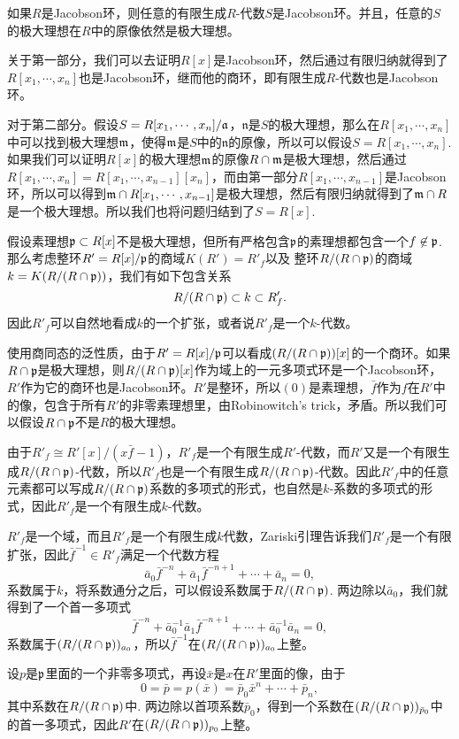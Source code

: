 \theo 如果$R$是Jacobson环，则任意的有限生成$R$-代数$S$是Jacobson环。并且，任意的$S$的极大理想在$R$中的原像依然是极大理想。

\proof 关于第一部分，我们可以去证明$R[x]$是Jacobson环，然后通过有限归纳就得到了$R[x_1,\cdots,x_n]$也是Jacobson环，继而他的商环，即有限生成$R$-代数也是Jacobson环。

对于第二部分。假设$S=R[x_1,\cdots,x_n]/\mathfrak{a}$，$\mathfrak{n}$是$S$的极大理想，那么在$R[x_1,\cdots,x_n]$中可以找到极大理想$\mathfrak{m}$，使得$\mathfrak{m}$是$S$中的$\mathfrak{n}$的原像，所以可以假设$S=R[x_1,\cdots,x_n]$. 如果我们可以证明$R[x]$的极大理想$\mathfrak{m}$的原像$R\cap \mathfrak{m}$是极大理想，然后通过$R[x_1,\cdots,x_{n}]=R[x_1,\cdots,x_{n-1}][x_n]$，而由第一部分$R[x_1,\cdots,x_{n-1}]$是Jacobson环，所以可以得到$\mathfrak{m}\cap R[x_1,\cdots,x_{n-1}]$是极大理想，然后有限归纳就得到了$\mathfrak{m} \cap R$是一个极大理想。所以我们也将问题归结到了$S=R[x]$.

假设素理想$\mathfrak{p}\subset R[x]$不是极大理想，但所有严格包含$\mathfrak{p}$的素理想都包含一个$f\not\in \mathfrak{p}$. 那么考虑整环$R'=R[x]/\mathfrak{p}$的商域$K(R')=R'_f$以及
整环$R/(R\cap \mathfrak{p})$的商域$k=K(R/(R\cap \mathfrak{p}))$，我们有如下包含关系
\[
	R/(R\cap \mathfrak{p})\subset k \subset R'_{f}.
\]
因此$R'_f$可以自然地看成$k$的一个扩张，或者说$R'_f$是一个$k$-代数。

使用商同态的泛性质，由于$R'=R[x]/\mathfrak{p}$可以看成$(R/(R\cap \mathfrak{p}))[x]$的一个商环。如果$R\cap \mathfrak{p}$是极大理想，则$R/(R\cap \mathfrak{p})[x]$作为域上的一元多项式环是一个Jacobson环，$R'$作为它的商环也是Jacobson环。$R'$是整环，所以$(0)$是素理想，$\bar{f}$作为$f$在$R'$中的像，包含于所有$R'$的非零素理想里，由Robinowitch's trick，矛盾。所以我们可以假设$R\cap \mathfrak{p}$不是$R$的极大理想。

由于$R'_f\cong R'[x]/(x\bar{f}-1)$，$R'_f$是一个有限生成$R'$-代数，而$R'$又是一个有限生成$R/(R\cap \mathfrak{p})$-代数，所以$R'_{f}$也是一个有限生成$R/(R\cap \mathfrak{p})$-代数。因此$R'_f$中的任意元素都可以写成$R/(R\cap \mathfrak{p})$系数的多项式的形式，也自然是$k$-系数的多项式的形式，因此$R'_f$是一个有限生成$k$-代数。

$R'_f$是一个域，而且$R'_f$是一个有限生成$k$代数，Zariski引理告诉我们$R'_f$是一个有限扩张，因此$\bar{f}^{-1}\in R'_f$满足一个代数方程
\[
	\bar{a}_0\bar{f}^{-n}+\bar{a}_{1}\bar{f}^{-n+1}+\cdots+\bar{a}_n=0,
\]
系数属于$k$，将系数通分之后，可以假设系数属于$R/(R\cap \mathfrak{p})$. 两边除以$\bar{a}_0$，我们就得到了一个首一多项式
\[
	\bar{f}^{-n}+\bar{a}_0^{-1}\bar{a}_{1}\bar{f}^{-n+1}+\cdots+\bar{a}_0^{-1}\bar{a}_n=0,
\]
系数属于$(R/(R\cap \mathfrak{p}))_{a_0}$，所以$\bar{f}^{-1}$在$(R/(R\cap \mathfrak{p}))_{a_0}$上整。

设$p$是$\mathfrak{p}$里面的一个非零多项式，再设$\bar{x}$是$x$在$R'$里面的像，由于
\[
	0=\bar{p}=p(\bar{x})=\bar{p}_0\bar{x}^n+\cdots+\bar{p}_n,
\]
其中系数在$R/(R\cap \mathfrak{p})$中. 两边除以首项系数$\bar{p}_0$，得到一个系数在$(R/(R\cap \mathfrak{p}))_{\bar{p}_0}$中的首一多项式，因此$R'$在$(R/(R\cap \mathfrak{p}))_{p_0}$上整。

